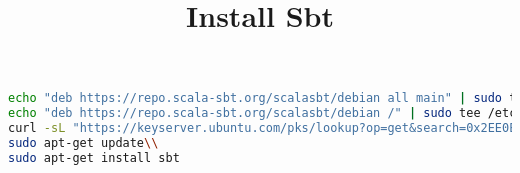 \documentclass{article}
\title{Install Sbt}
\begin{document}
\maketitle

\begin{lstlisting}[language=bash]
echo "deb https://repo.scala-sbt.org/scalasbt/debian all main" | sudo tee /etc/apt/sources.list.d/sbt.list\\
echo "deb https://repo.scala-sbt.org/scalasbt/debian /" | sudo tee /etc/apt/sources.list.d/sbt_old.list\\
curl -sL "https://keyserver.ubuntu.com/pks/lookup?op=get&search=0x2EE0EA64E40A89B84B2DF73499E82A75642AC823" | sudo apt-key add\\
sudo apt-get update\\
sudo apt-get install sbt
\end{lstlisting}
\end{document}
